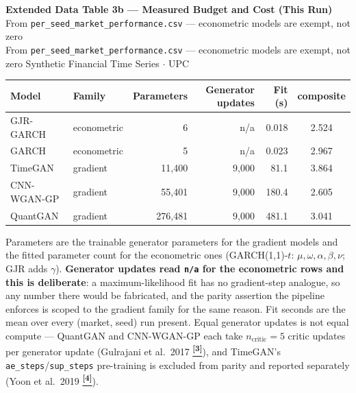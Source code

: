 \documentclass[10pt]{article}
\newcommand{\pagehead}[2]{%
  \begin{tcolorbox}[enhanced,arc=0pt,outer arc=0pt,boxrule=0pt,
    colback=Navy,colframe=Navy,
    top=5pt,bottom=5pt,left=8pt,right=8pt,
    before skip=0pt,after skip=10pt]
  {\color{white}\large\bfseries #1}%
  \ifx\relax#2\relax\else\\[1pt]{\color{blue!30!white}\small #2}\fi
  \hfill{\color{blue!20!white}\footnotesize Synthetic Financial Time Series $\cdot$ UPC}
  \end{tcolorbox}}
\newcommand{\tcite}[1]{%
  \hyperlink{R:#1}{\textsuperscript{\scriptsize\textbf{[#1]}}}}
\begin{document}
\vspace{6pt}
\pagehead{Extended Data Table 3b --- Measured Budget and Cost (This Run)}
         {From \texttt{per\_seed\_market\_performance.csv} --- econometric models are exempt, not zero}

\vspace{4pt}
{\small
\begin{tabular}{@{}llrrrc@{}}
\toprule
Model & Family & Parameters & Generator updates & Fit (s) & composite \\
\midrule
GJR-GARCH & econometric & 6 & n/a & 0.018 & 2.524 \\
GARCH & econometric & 5 & n/a & 0.023 & 2.967 \\
TimeGAN & gradient & 11,400 & 9,000 & 81.1 & 3.864 \\
CNN-WGAN-GP & gradient & 55,401 & 9,000 & 180.4 & 2.605 \\
QuantGAN & gradient & 276,481 & 9,000 & 481.1 & 3.041 \\
\bottomrule
\end{tabular}}

\smallskip
{\small Parameters are the trainable generator parameters for the gradient models and the fitted parameter count for the econometric ones (GARCH(1,1)-$t$: $\mu,\omega,\alpha,\beta,\nu$; GJR adds $\gamma$). \textbf{Generator updates read \texttt{n/a} for the econometric rows and this is deliberate}: a maximum-likelihood fit has no gradient-step analogue, so any number there would be fabricated, and the parity assertion the pipeline enforces is scoped to the gradient family for the same reason. Fit seconds are the mean over every (market, seed) run present. Equal generator updates is not equal compute --- QuantGAN and CNN-WGAN-GP each take $n_\text{critic}=5$ critic updates per generator update (Gulrajani et al.\ 2017\tcite{3}), and TimeGAN's \texttt{ae\_steps}/\texttt{sup\_steps} pre-training is excluded from parity and reported separately (Yoon et al.\ 2019\tcite{4}).}
\end{document}
